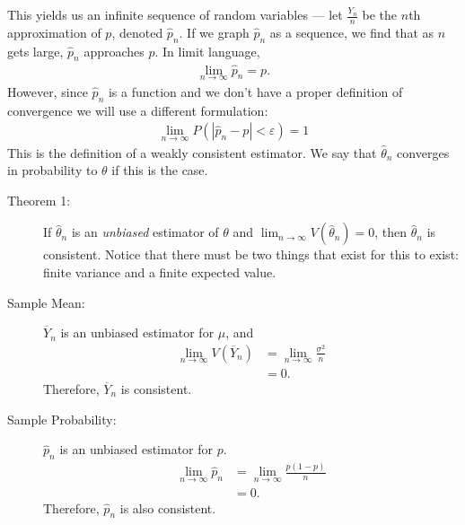 \documentclass[10pt]{extarticle}
\begin{document}
  This yields us an infinite sequence of random variables --- let $\frac{Y_n}{n}$ be the $n$th approximation of $p$, denoted $\hat{p}_n$. If we graph $\hat{p}_n$ as a sequence, we find that as $n$ gets large, $\hat{p}_n$ approaches $p$. In limit language,
  \begin{align*}
    \lim_{n\rightarrow \infty}\hat{p}_n = p.
  \end{align*}
  However, since $\hat{p}_n$ is a function and we don't have a proper definition of convergence we will use a different formulation:
  \begin{align*}
    \lim_{n\rightarrow \infty} P(|\hat{p}_n - p| < \varepsilon) = 1 \tag*{$\forall \varepsilon > 0$.}
  \end{align*}
  This is the definition of a weakly consistent estimator. We say that $\hat{\theta}_n$ converges in probability to $\theta$ if this is the case.
  \begin{description}
    \item[Theorem 1:] If $\hat{\theta}_n$ is an \textit{unbiased} estimator of $\theta$ and $\lim_{n\rightarrow\infty}V(\hat{\theta}_n) = 0$, then $\hat{\theta}_n$ is consistent. Notice that there must be two things that exist for this to exist: finite variance and a finite expected value.
  \end{description}
  \begin{description}
    \item[Sample Mean:] $\overline{Y}_n$ is an unbiased estimator for $\mu$, and
      \begin{align*}
        \lim_{n\rightarrow \infty}V(\overline{Y}_n)  &= \lim_{n\rightarrow\infty}\frac{\sigma^2}{n}\\
                                                     &= 0.
      \end{align*}
      Therefore, $\overline{Y}_{n}$ is consistent.
    \item[Sample Probability:] $\hat{p}_n$ is an unbiased estimator for $p$.
      \begin{align*}
        \lim_{n\rightarrow\infty} \hat{p}_{n} &= \lim_{n\rightarrow\infty}\frac{p(1-p)}{n}\\
                                              &= 0.
      \end{align*}
      Therefore, $\hat{p}_n$ is also consistent.
  \end{description}
\end{document}
